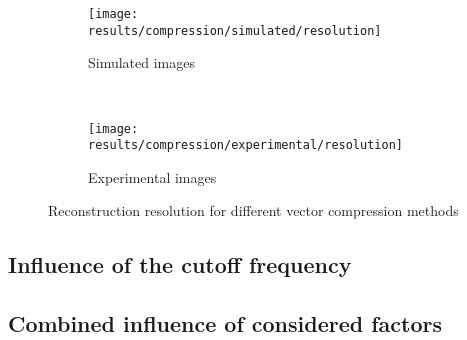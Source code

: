 \documentclass[../main.tex]{subfiles}
\begin{document}
\begin{figure}[htbp]
    \centering
    \begin{subfigure}[b]{.8\textwidth}
         \centering
         \texttt{[image: results/compression/simulated/resolution]}
         \caption{Simulated images}
    \end{subfigure}\\
    \vspace{2em}
    \begin{subfigure}[b]{.8\textwidth}
         \centering
         \texttt{[image: results/compression/experimental/resolution]}
         \caption{Experimental images}
    \end{subfigure}
    \caption{Reconstruction resolution for different vector compression methods}
    \label{fig:5:compression_resolution}
\end{figure}


\subsection{Influence of the cutoff frequency}

\subsection{Combined influence of considered factors}
\end{document}
